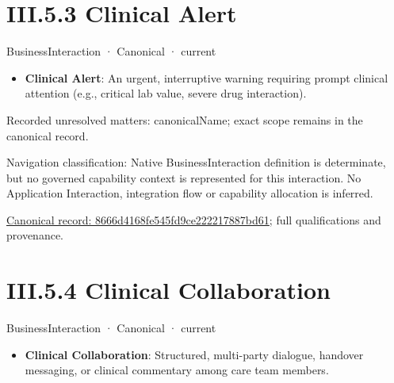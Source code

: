 \section*{III.5.3 Clinical Alert}
\label{navigation:III.5.3}

\label{element:8666d4168fe545fd9ce222217887bd61}
{\small BusinessInteraction · Canonical · current}\par

\begin{itemize}


\item \textbf{Clinical Alert}: An urgent, interruptive warning requiring prompt clinical attention (e.g., critical lab value, severe drug interaction).

\end{itemize}

{\small Recorded unresolved matters: canonicalName; exact scope remains in the canonical record.}\par
{\small Navigation classification: Native BusinessInteraction definition is determinate, but no governed capability context is represented for this interaction. No Application Interaction, integration flow or capability allocation is inferred.}\par
{\footnotesize \href{../../../../../../../continuum/business/business-interaction/8666d4168fe545fd9ce222217887bd61.md}{Canonical record: 8666d4168fe545fd9ce222217887bd61}; full qualifications and provenance.}\par
\section*{III.5.4 Clinical Collaboration}
\label{navigation:III.5.4}

\label{element:f54492b30639431e80cd0723217d6be8}
{\small BusinessInteraction · Canonical · current}\par

\begin{itemize}


\item \textbf{Clinical Collaboration}: Structured, multi-party dialogue, handover messaging, or clinical commentary among care team members.

\end{itemize}

